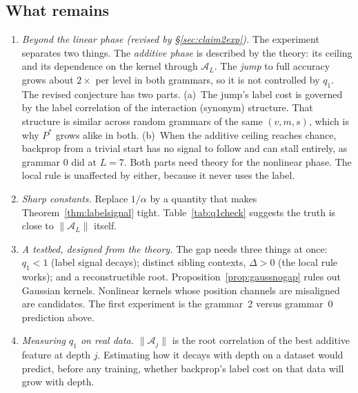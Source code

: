 \documentclass[11pt]{article}
\theoremstyle{definition}
\newcommand{\norm}[1]{\lVert #1\rVert}
\begin{document}
\subsection{What remains}
\begin{enumerate}
\item \emph{Beyond the linear phase (revised by \S\ref{sec:claim2exp}).} The experiment separates two
things. The \emph{additive phase} is described by the theory: its ceiling and its dependence on the
kernel through $\mathcal A_L$. The \emph{jump} to full accuracy grows about $2\times$ per level in both
grammars, so it is not controlled by $q_1$. The revised conjecture has two parts. (a)~The jump's
label cost is governed by the label correlation of the interaction (synonym) structure. That structure
is similar across random grammars of the same $(v,m,s)$, which is why $P^*$ grows alike in both.
(b)~When the additive ceiling reaches chance, backprop from a trivial start has no signal to follow
and can stall entirely, as grammar 0 did at $L=7$. Both parts need theory for the nonlinear phase.
The local rule is unaffected by either, because it never uses the label.
\item \emph{Sharp constants.} Replace $1/\alpha$ by a quantity that makes Theorem~\ref{thm:labelsignal}
tight. Table~\ref{tab:q1check} suggests the truth is close to $\norm{\mathcal A_L}$ itself.
\item \emph{A testbed, designed from the theory.} The gap needs three things at once: $q_1<1$ (label
signal decays); distinct sibling contexts, $\Delta>0$ (the local rule works); and a reconstructible root.
Proposition~\ref{prop:gaussnogap} rules out Gaussian kernels. Nonlinear kernels whose position channels
are misaligned are candidates. The first experiment is the grammar~2 versus grammar~0 prediction above.
\item \emph{Measuring $q_1$ on real data.} $\norm{\mathcal A_j}$ is the root correlation of the best additive
feature at depth $j$. Estimating how it decays with depth on a dataset would predict, before any
training, whether backprop's label cost on that data will grow with depth.
\end{enumerate}

\end{document}
